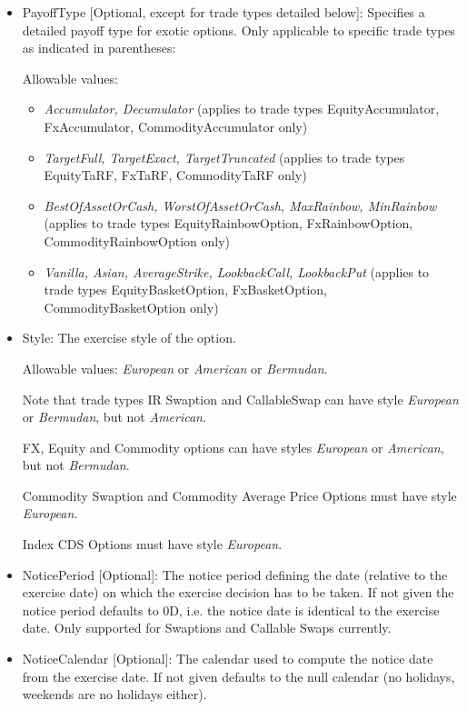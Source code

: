 \begin{itemize}
\item PayoffType [Optional, except for trade types detailed below]: Specifies a detailed payoff type for exotic options. Only applicable to specific trade types as
  indicated in parentheses:

  Allowable values:
  \begin{itemize}
  \item \emph{Accumulator, Decumulator} (applies to trade types EquityAccumulator, FxAccumulator, CommodityAccumulator only)
  \item \emph{TargetFull, TargetExact, TargetTruncated} (applies to trade types EquityTaRF, FxTaRF, CommodityTaRF only)
  \item \emph{BestOfAssetOrCash, WorstOfAssetOrCash, MaxRainbow, MinRainbow} (applies to trade types EquityRainbowOption,
    FxRainbowOption, CommodityRainbowOption only)
  \item \emph{Vanilla, Asian, AverageStrike, LookbackCall, LookbackPut} (applies to trade types EquityBasketOption,
    FxBasketOption, CommodityBasketOption only)
  \end{itemize}

\item Style: The exercise style of the option. 

  Allowable values: \emph{European} or \emph{American} or \emph{Bermudan}. 
  
  Note that trade types IR Swaption and CallableSwap can have style
  \emph{European} or \emph{Bermudan}, but not \emph{American}.  
  
  FX, Equity and Commodity options can have styles \emph{European}
  or \emph{American}, but not \emph{Bermudan}. 
  
  Commodity Swaption and Commodity Average Price Options must have style \emph{European}. 
  
  Index CDS Options must have style  \emph{European}. 

\item NoticePeriod [Optional]: The notice period defining the date (relative to the exercise date) on which the exercise
  decision has to be taken. If not given the notice period defaults to 0D, i.e. the notice date is identical to the
  exercise date. Only supported for Swaptions and Callable Swaps currently.

\item NoticeCalendar [Optional]: The calendar used to compute the notice date from the exercise date. If not given
  defaults to the null calendar (no holidays, weekends are no holidays either).


\end{itemize}
